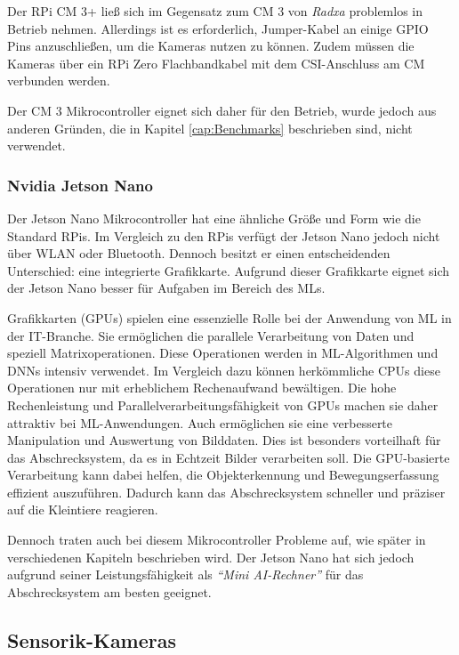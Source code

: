 Der \ac{RPi} \ac{CM} 3+ ließ sich im Gegensatz zum \ac{CM} 3 von \textit{Radxa} problemlos in Betrieb nehmen. Allerdings ist es erforderlich, Jumper-Kabel an einige \ac{GPIO} Pins anzuschließen, um die Kameras nutzen zu können. Zudem müssen die Kameras über ein \ac{RPi} Zero Flachbandkabel mit dem \acs{CSI}-Anschluss am \ac{CM} verbunden werden. \cite{cm3}

Der \ac{CM} 3 Mikrocontroller eignet sich daher für den Betrieb, wurde jedoch aus anderen Gründen, die in Kapitel \ref{cap:Benchmarks} beschrieben sind, nicht verwendet.

\subsubsection{Nvidia Jetson Nano}

Der Jetson Nano Mikrocontroller hat eine ähnliche Größe und Form wie die Standard \ac{RPi}s. Im Vergleich zu den \ac{RPi}s verfügt der Jetson Nano jedoch nicht über WLAN oder Bluetooth. Dennoch besitzt er einen entscheidenden Unterschied: eine integrierte Grafikkarte. Aufgrund dieser Grafikkarte eignet sich der Jetson Nano besser für Aufgaben im Bereich des \acl{ML}s. \cite{nvidia_jn}

Grafikkarten (\acs{GPU}s) spielen eine essenzielle Rolle bei der Anwendung von \ac{ML} in der IT-Branche. Sie ermöglichen die parallele Verarbeitung von Daten und speziell Matrixoperationen. Diese Operationen werden in \ac{ML}-Algorithmen und \ac{DNN}s intensiv verwendet. Im Vergleich dazu können herkömmliche CPUs diese Operationen nur mit erheblichem Rechenaufwand bewältigen. Die hohe Rechenleistung und Parallelverarbeitungsfähigkeit von GPUs machen sie daher attraktiv bei \ac{ML}-Anwendungen. Auch ermöglichen sie eine verbesserte Manipulation und Auswertung von Bilddaten. Dies ist besonders vorteilhaft für das Abschrecksystem, da es in Echtzeit Bilder verarbeiten soll.
Die \ac{GPU}-basierte Verarbeitung kann dabei helfen, die Objekterkennung und Bewegungserfassung effizient auszuführen. Dadurch kann das Abschrecksystem schneller und präziser auf die Kleintiere reagieren. \cite{gpus}

Dennoch traten auch bei diesem Mikrocontroller Probleme auf, wie später in verschiedenen Kapiteln beschrieben wird. Der Jetson Nano hat sich jedoch aufgrund seiner Leistungsfähigkeit als \textit{\enquote{Mini AI-Rechner}} für das Abschrecksystem am besten geeignet.

\subsection{Sensorik-Kameras}

